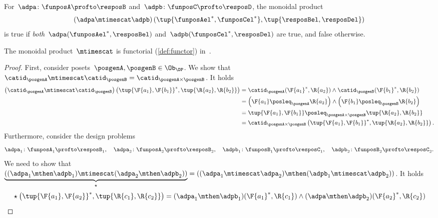 \begin{remark}
  For~$\adpa \colon \funposA\profto \resposB$ and~$\adpb \colon \funposC \profto \resposD$, the monoidal product
  \begin{equation}
    \left(\adpa \mtimescat \adpb\right)(\tup{\funposAel^*, \funposCel^*}, \tup{\resposBel,\resposDel})
  \end{equation}
  is true if \emph{both}~$\adpa(\funposAel^*,\resposBel)$ and~$\adpb(\funposCel^*,\resposDel)$ are true, and false otherwise.
\end{remark}

\begin{lemma}
  \label{lem:monoidal_functorial}
  The monoidal product~$\mtimescat$ is functorial (\cref{def:functor}) in~\DP.
\end{lemma}
\begin{proof}
  First, consider posets~$\posgenA,\posgenB\in \Ob_\DP$. We show that~$\catid_\posgenA\mtimescat \catid_\posgenB = \catid_{\posgenA\times \posgenB}$. It holds
  \begin{equation}
    \begin{aligned}
      \left( \catid_{\posgenA}\mtimescat \catid_{\posgenB}\right)
      \left( \tup{\F{a_1},\F{b_1}}^*,\tup{\R{a_2},\R{b_2}}\right)&=
      \catid_\posgenA(\F{a_1}^*,\R{a_2})\wedge \catid_\posgenB(\F{b_1}^*,\R{b_2})\\
      &=\left( \F{a_1}\posleq_\posgenA \R{a_2}\right)\wedge \left( \F{b_1}\posleq_\posgenB \R{b_2}\right)\\
      &=\tup{\F{a_1},\F{b_1}}\posleq_{\posgenA\times \posgenB}\tup{\R{a_2},\R{b_2}}\\
      &=\catid_{\posgenA\times \posgenB}\left( \tup{\F{a_1},\F{b_1}}^*,\tup{\R{a_2},\R{b_2}}\right).
    \end{aligned}
  \end{equation}
  Furthermore, consider the design problems
  \begin{equation*}
    \adpa_1\colon \funposA_1 \profto \resposB_1,\quad \adpa_2\colon \funposA_2\profto \resposB_2, \quad \adpb_1\colon \funposB_1\profto \resposC_1,\quad \adpb_2\colon \funposB_2\profto \resposC_2.
  \end{equation*}
  We need to show that~$\underbrace{\left( (\adpa_1\mthen \adpb_1) \mtimescat (\adpa_2\mthen \adpb_2)\right)}_{\star}=\left( (\adpa_1\mtimescat \adpa_2)\mthen (\adpb_1\mtimescat \adpb_2)\right)$.
  It holds
  \begin{equation}
    \begin{aligned}
      &\star \left( \tup{\F{a_1},\F{a_2}}^*,\tup{\R{c_1},\R{c_2}}\right)=(\adpa_1\mthen \adpb_1)(\F{a_1}^*,\R{c_1})\wedge (\adpa\mthen \adpb_2)(\F{a_2}^*,\R{c_2})\\

\end{aligned}
\end{equation}
\end{proof}
